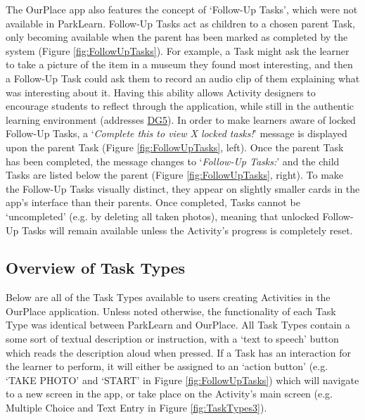 The OurPlace app also features the concept of `Follow-Up Tasks', which were not available in ParkLearn. Follow-Up Tasks act as children to a chosen parent Task, only becoming available when the parent has been marked as completed by the system (Figure \ref{fig:FollowUpTasks}). For example, a Task might ask the learner to take a picture of the item in a museum they found most interesting, and then a Follow-Up Task could ask them to record an audio clip of them explaining what was interesting about it. Having this ability allows Activity designers to encourage students to reflect through the application, while still in the authentic learning environment (addresses \hyperref[DG5]{DG5}). In order to make learners aware of locked Follow-Up Tasks, a `\textit{Complete this to view X locked tasks!}' message is displayed upon the parent Task (Figure \ref{fig:FollowUpTasks}, left). Once the parent Task has been completed, the message changes to `\textit{Follow-Up Tasks:}' and the child Tasks are listed below the parent (Figure \ref{fig:FollowUpTasks}, right). To make the Follow-Up Tasks visually distinct, they appear on slightly smaller cards in the app's interface than their parents. Once completed, Tasks cannot be `uncompleted' (e.g. by deleting all taken photos), meaning that unlocked Follow-Up Tasks will remain available unless the Activity's progress is completely reset.


\subsection{Overview of Task Types}
\label{sec:TaskTypes}
Below are all of the Task Types available to users creating Activities in the OurPlace application. Unless noted otherwise, the functionality of each Task Type was identical between ParkLearn and OurPlace. All Task Types contain a some sort of textual description or instruction, with a `text to speech' button which reads the description aloud when pressed. If a Task has an interaction for the learner to perform, it will either be assigned to an `action button' (e.g. `TAKE PHOTO' and `START' in Figure \ref{fig:FollowUpTasks}) which will navigate to a new screen in the app, or take place on the Activity's main screen (e.g. Multiple Choice and Text Entry in Figure \ref{fig:TaskTypes3}). 

